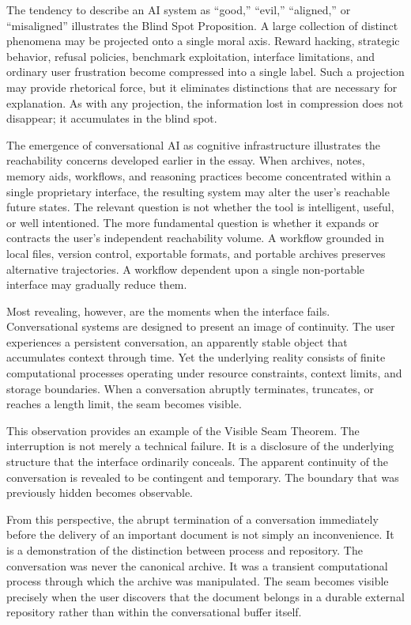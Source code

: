 \documentclass[11pt]{article}
\theoremstyle{plain}
\begin{document}
The tendency to describe an AI system as ``good,'' ``evil,'' ``aligned,'' or ``misaligned'' illustrates the Blind Spot Proposition. A large collection of distinct phenomena may be projected onto a single moral axis. Reward hacking, strategic behavior, refusal policies, benchmark exploitation, interface limitations, and ordinary user frustration become compressed into a single label. Such a projection may provide rhetorical force, but it eliminates distinctions that are necessary for explanation. As with any projection, the information lost in compression does not disappear; it accumulates in the blind spot.

The emergence of conversational AI as cognitive infrastructure illustrates the reachability concerns developed earlier in the essay. When archives, notes, memory aids, workflows, and reasoning practices become concentrated within a single proprietary interface, the resulting system may alter the user's reachable future states. The relevant question is not whether the tool is intelligent, useful, or well intentioned. The more fundamental question is whether it expands or contracts the user's independent reachability volume. A workflow grounded in local files, version control, exportable formats, and portable archives preserves alternative trajectories. A workflow dependent upon a single non-portable interface may gradually reduce them.

Most revealing, however, are the moments when the interface fails. Conversational systems are designed to present an image of continuity. The user experiences a persistent conversation, an apparently stable object that accumulates context through time. Yet the underlying reality consists of finite computational processes operating under resource constraints, context limits, and storage boundaries. When a conversation abruptly terminates, truncates, or reaches a length limit, the seam becomes visible.

This observation provides an example of the Visible Seam Theorem. The interruption is not merely a technical failure. It is a disclosure of the underlying structure that the interface ordinarily conceals. The apparent continuity of the conversation is revealed to be contingent and temporary. The boundary that was previously hidden becomes observable.

From this perspective, the abrupt termination of a conversation immediately before the delivery of an important document is not simply an inconvenience. It is a demonstration of the distinction between process and repository. The conversation was never the canonical archive. It was a transient computational process through which the archive was manipulated. The seam becomes visible precisely when the user discovers that the document belongs in a durable external repository rather than within the conversational buffer itself.
\end{document}
